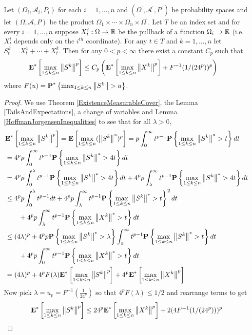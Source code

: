 \begin{thm}\label{HoffmanJorgensenMomentInequalities}Let $(\Omega_i,\mathcal{A}_i, P_i)$ for each $i=1, \dotsc, n$ and $(\Omega^\prime, \mathcal{A}^\prime, P^\prime)$ be probability spaces and let $(\Omega, \mathcal{A}, P)$ be the product $\Omega_1 \times \dotsb \times \Omega_n \times \Omega^\prime$.  Let $T$ be an index set and for every $i=1, \dotsc, n$ suppose $X^i_t : \Omega \to \mathbb{R}$ be the pullback of a function $\Omega_i \to \mathbb{R}$ (i.e. $X^i_t$ depends only on the $i^{th}$ coordinate).  For any $t \in T$ and $k=1, \dotsc, n$ let $S^k_t = X^1_t + \dotsb + X^k_t$.  Then for any $0 < p < \infty$ there exist a constant $C_p$ such that
\begin{align*}
\textbf{E}^*\left[\max_{1 \leq k \leq n} \left \lVert S^k \right \rVert^p\right] &\leq C_p \left( \textbf{E}^*\left[\max_{1 \leq k \leq n} \left \lVert X^k \right \rVert^p\right] + F^{-1}(1/(24^p))^p \right)
\end{align*}
where $F(u) = \textbf{P}^* \left \{\max_{1 \leq k \leq n} \left \lVert S^k \right \rVert>u \right \}$.
\end{thm}
\begin{proof}
We use Theorem \ref{ExistenceMeasurableCover}, the Lemma \ref{TailsAndExpectations}, a change of variables and Lemma \ref{HoffmanJorgensenInequalities} to see that for all $\lambda > 0$,
\begin{align*}
&\textbf{E}^*\left[\max_{1 \leq k \leq n} \left \lVert S^k \right \rVert^p\right] 
= \textbf{E}\left[\max_{1 \leq k \leq n} (\left \lVert S^k \right \rVert^*)^p\right]  
= p \int_0^\infty t^{p-1} \textbf{P}\left \{\max_{1 \leq k \leq n} \left \lVert S^k \right \rVert^* > t \right \}  dt \\
&= 4^p p \int_0^\infty t^{p-1} \textbf{P}\left \{\max_{1 \leq k \leq n} \left \lVert S^k \right \rVert^* > 4t \right \}  dt \\
&= 4^p p \int_0^\lambda t^{p-1} \textbf{P}\left \{\max_{1 \leq k \leq n} \left \lVert S^k \right \rVert^* > 4t \right \}  dt  + 4^p p\int_\lambda^\infty t^{p-1} \textbf{P}\left \{\max_{1 \leq k \leq n} \left \lVert S^k \right \rVert^* > 4t \right \}  dt \\
&\leq 4^p p \int_0^\lambda  t^{p-1}  dt  + 4^p p \int_\lambda^\infty t^{p-1} \textbf{P}\left \{\max_{1 \leq k \leq n} \left \lVert S^k \right \rVert^* > t \right \}^2  dt \\
&\qquad + 4^p p \int_\lambda^\infty t^{p-1} \textbf{P}\left \{\max_{1 \leq k \leq n} \left \lVert X^k \right \rVert^* > t \right \}  dt \\
&\leq (4\lambda)^p  + 4^p p \textbf{P}\left \{\max_{1 \leq k \leq n} \left \lVert S^k \right \rVert^* > \lambda \right \} \int_0^\infty t^{p-1} \textbf{P}\left \{\max_{1 \leq k \leq n} \left \lVert S^k \right \rVert^* > t \right \}  dt \\
&\qquad + 4^p p \int_0^\infty t^{p-1} \textbf{P}\left \{\max_{1 \leq k \leq n} \left \lVert X^k \right \rVert^* > t \right \}  dt \\
&= (4\lambda)^p  + 4^pF(\lambda) \textbf{E}^*\left[\max_{1 \leq k \leq n} \left \lVert S^k \right \rVert^p\right] + 4^p \textbf{E}^*\left[\max_{1 \leq k \leq n} \left \lVert X^k \right \rVert^p\right]
\end{align*}
Now pick $\lambda = u_p = F^{-1}(\frac{1}{24^p})$ so that $4^p F(\lambda) \leq 1/2$ and rearrange terms to get
\begin{align*}
\textbf{E}^*\left[\max_{1 \leq k \leq n} \left \lVert S^k \right \rVert^p\right]  \leq 2 4^p  \textbf{E}^*\left[\max_{1 \leq k \leq n} \left \lVert X^k \right \rVert^p\right] + 2 (4 F^{-1}(1/(24^p)))^p
\end{align*}
\end{proof}

